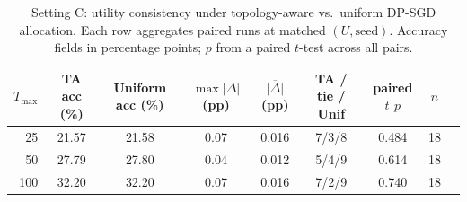 \begin{table}[t]
\centering
\caption{Setting C: utility consistency under topology-aware vs.\ uniform DP-SGD allocation. Each row aggregates paired runs at matched $(U, \text{seed})$. Accuracy fields in percentage points; $p$ from a paired $t$-test across all pairs.}
\label{tab:util-consistency-c}
\begin{tabular}{@{}rcccccccc@{}}
\toprule
$T_{\max}$ & TA acc (\%) & Uniform acc (\%) & $\max|\Delta|$ (pp) & $\overline{|\Delta|}$ (pp) & TA / tie / Unif & paired $t$ $p$ & $n$ \\
\midrule
25 & 21.57 & 21.58 & 0.07 & 0.016 & 7/3/8 & 0.484 & 18 \\
50 & 27.79 & 27.80 & 0.04 & 0.012 & 5/4/9 & 0.614 & 18 \\
100 & 32.20 & 32.20 & 0.07 & 0.016 & 7/2/9 & 0.740 & 18 \\
\bottomrule
\end{tabular}
\end{table}
